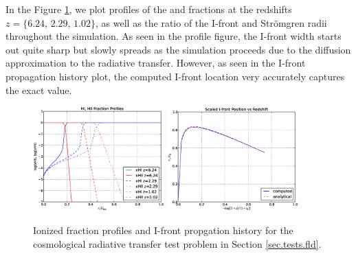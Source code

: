 In the Figure \ref{fig.fld}, we plot profiles of the  and
 fractions at the redshifts $z=\{6.24,\, 2.29,\, 1.02\}$, as
well as the ratio of the I-front and Str{\" o}mgren radii throughout
the simulation.  As seen in the profile figure, the I-front width
starts out quite sharp but slowly spreads as the simulation proceeds
due to the diffusion approximation to the radiative transfer.
However, as seen in the I-front propagation history plot, the computed
I-front location very accurately captures the exact value.

\begin{figure}
\begin{center}
\includegraphics[width=0.45\textwidth]{figures/FLDprofiles.eps}
\includegraphics[width=0.45\textwidth]{figures/FLDhistory.eps}
\caption{Ionized fraction profiles and I-front propgation history for
the cosmological radiative transfer test problem in
Section \ref{sec.tests.fld}.}
\label{fig.fld}
\end{center}
\end{figure}

